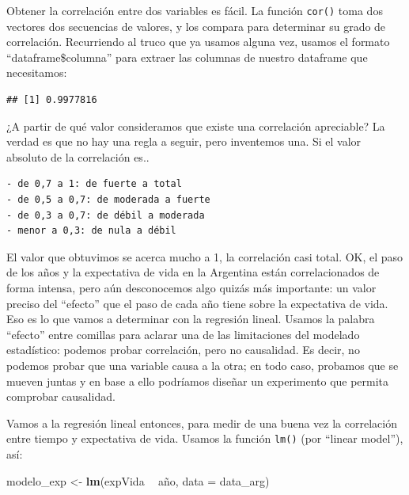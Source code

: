 \documentclass[]{book}
\newenvironment{Shaded}{\begin{snugshade}}{\end{snugshade}}
\newcommand{\KeywordTok}[1]{\textcolor[rgb]{0.13,0.29,0.53}{\textbf{#1}}}
\newcommand{\DataTypeTok}[1]{\textcolor[rgb]{0.13,0.29,0.53}{#1}}
\newcommand{\StringTok}[1]{\textcolor[rgb]{0.31,0.60,0.02}{#1}}
\newcommand{\OperatorTok}[1]{\textcolor[rgb]{0.81,0.36,0.00}{\textbf{#1}}}
\newcommand{\NormalTok}[1]{#1}
\begin{document}
Obtener la correlación entre dos variables es fácil. La función
\texttt{cor()} toma dos vectores dos secuencias de valores, y los
compara para determinar su grado de correlación. Recurriendo al truco
que ya usamos alguna vez, usamos el formato ``dataframe\$columna'' para
extraer las columnas de nuestro dataframe que necesitamos:

\begin{Shaded}
\end{Shaded}

\begin{verbatim}
## [1] 0.9977816
\end{verbatim}

¿A partir de qué valor consideramos que existe una correlación
apreciable? La verdad es que no hay una regla a seguir, pero inventemos
una. Si el valor absoluto de la correlación es..

\begin{verbatim}
- de 0,7 a 1: de fuerte a total
- de 0,5 a 0,7: de moderada a fuerte
- de 0,3 a 0,7: de débil a moderada
- menor a 0,3: de nula a débil
\end{verbatim}

El valor que obtuvimos se acerca mucho a 1, la correlación casi total.
OK, el paso de los años y la expectativa de vida en la Argentina están
correlacionados de forma intensa, pero aún desconocemos algo quizás más
importante: un valor preciso del ``efecto'' que el paso de cada año
tiene sobre la expectativa de vida. Eso es lo que vamos a determinar con
la regresión lineal. Usamos la palabra ``efecto'' entre comillas para
aclarar una de las limitaciones del modelado estadístico: podemos probar
correlación, pero no causalidad. Es decir, no podemos probar que una
variable causa a la otra; en todo caso, probamos que se mueven juntas y
en base a ello podríamos diseñar un experimento que permita comprobar
causalidad.

Vamos a la regresión lineal entonces, para medir de una buena vez la
correlación entre tiempo y expectativa de vida. Usamos la función
\texttt{lm()} (por ``linear model''), así:

\begin{Shaded}
\begin{Highlighting}[]
\NormalTok{modelo_exp <-}\StringTok{ }\KeywordTok{lm}\NormalTok{(expVida }\OperatorTok{~}\StringTok{ }\NormalTok{año, }\DataTypeTok{data =}\NormalTok{ data_arg)}
\end{Highlighting}
\end{Shaded}
\end{document}
